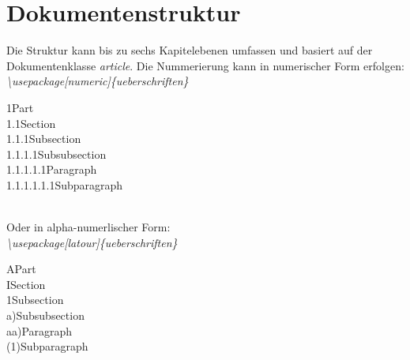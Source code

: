 \documentclass[12pt]{article}
\begin{document}
\part{Dokumentenstruktur}
Die Struktur kann bis zu sechs Kapitelebenen umfassen und basiert auf der Dokumentenklasse \textit{article}. Die Nummerierung kann in numerischer Form erfolgen:\\\textit{\textbackslash usepackage[numeric]\{ueberschriften\}}\\[6pt]
\colorbox{grayBack}{\begin{minipage}{\textwidth}
\vspace{5pt}
\hspace{5pt}1\hspace{15pt}Part\\
\-\hspace{25pt} 1.1\hspace{10pt}Section\\
\-\hspace{50pt} 1.1.1\hspace{5pt}Subsection\\
\-\hspace{80pt} 1.1.1.1\hspace{5pt}Subsubsection\\
\-\hspace{120pt} 1.1.1.1.1\hspace{5pt}Paragraph\\
\-\hspace{170pt} 1.1.1.1.1.1\hspace{5pt}Subparagraph\vspace{5pt}
\end{minipage}
}\\[6pt]
Oder in alpha-numerlischer Form:\\\textit{\textbackslash usepackage[latour]\{ueberschriften\}}\\[6pt]
\colorbox{grayBack}{\begin{minipage}{\textwidth}
\vspace{5pt}
\hspace{5pt}A\hspace{10pt}Part\\
\-\hspace{25pt} I\hspace{10pt}Section\\
\-\hspace{45pt} 1\hspace{10pt}Subsection\\
\-\hspace{65pt} a)\hspace{10pt}Subsubsection\\
\-\hspace{85pt} aa)\hspace{5pt}Paragraph\\
\-\hspace{105pt} (1)\hspace{10pt}Subparagraph\vspace{5pt}
\end{minipage}
}
\end{document}
